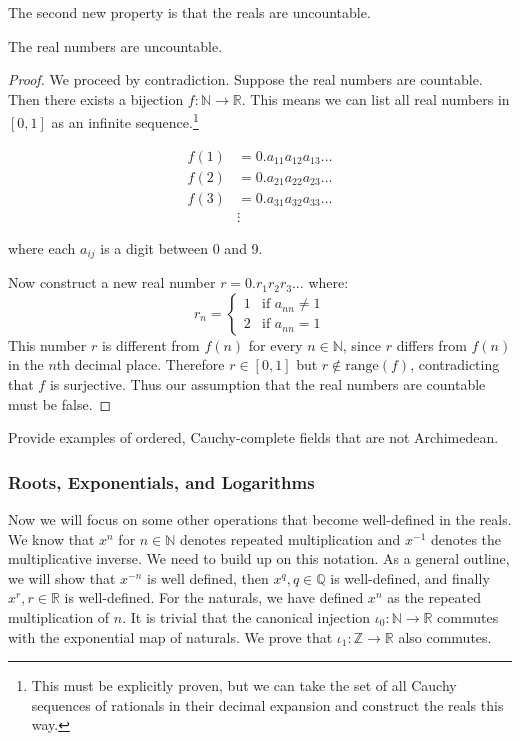     The second new property is that the reals are uncountable. 

    \begin{theorem}
      The real numbers are uncountable.
    \end{theorem}
    \begin{proof}
      We proceed by contradiction. Suppose the real numbers are countable. Then there exists a bijection $f: \mathbb{N} \to \mathbb{R}$. This means we can list all real numbers in $[0,1]$ as an infinite sequence.\footnote{This must be explicitly proven, but we can take the set of all Cauchy sequences of rationals in their decimal expansion and construct the reals this way.}
      
      \begin{align*}
        f(1) &= 0.a_{11}a_{12}a_{13}\dots \\
        f(2) &= 0.a_{21}a_{22}a_{23}\dots \\
        f(3) &= 0.a_{31}a_{32}a_{33}\dots \\
        &\vdots
      \end{align*}
      
      where each $a_{ij}$ is a digit between 0 and 9.
      
      Now construct a new real number $r = 0.r_1r_2r_3\dots$ where:
      \begin{equation}
        r_n = \begin{cases}
          1 & \text{if } a_{nn} \neq 1 \\
          2 & \text{if } a_{nn} = 1
        \end{cases}
      \end{equation}
      This number $r$ is different from $f(n)$ for every $n \in \mathbb{N}$, since $r$ differs from $f(n)$ in the $n$th decimal place. Therefore $r \in [0,1]$ but $r \notin \text{range}(f)$, contradicting that $f$ is surjective. Thus our assumption that the real numbers are countable must be false.
    \end{proof}

    Provide examples of ordered, Cauchy-complete fields that are not Archimedean.  

  \subsubsection{Roots, Exponentials, and Logarithms} 

    Now we will focus on some other operations that become well-defined in the reals. We know that $x^{n}$ for $n \in \mathbb{N}$ denotes repeated multiplication and $x^{-1}$ denotes the multiplicative inverse. We need to build up on this notation. As a general outline, we will show that $x^{-n}$ is well defined, then $x^q, q \in \mathbb{Q}$ is well-defined, and finally $x^r, r \in \mathbb{R}$ is well-defined. For the naturals, we have defined $x^n$ as the repeated multiplication of $n$. It is trivial that the canonical injection $\iota_0: \mathbb{N} \rightarrow \mathbb{R}$ commutes with the exponential map of naturals. We prove that $\iota_1: \mathbb{Z} \rightarrow \mathbb{R}$ also commutes. 

